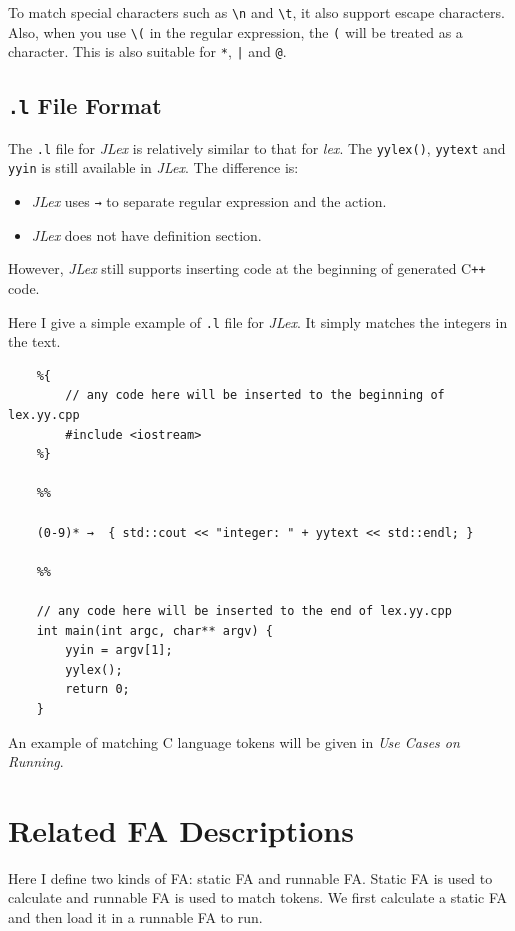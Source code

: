 \documentclass{article}
\begin{document}
To match special characters such as \texttt{\textbackslash n} and \texttt{\textbackslash t}, it also support escape characters. Also, when you use \texttt{\textbackslash (} in the regular expression, the \texttt{(} will be treated as a character. This is also suitable for \texttt{*}, \texttt{|} and \texttt{@}.

\subsection{\texttt{.l} File Format}

The \texttt{.l} file for \textit{JLex} is relatively similar to that for \textit{lex}. The \texttt{yylex()}, \texttt{yytext} and \texttt{yyin} is still available in \textit{JLex}. The difference is:
\begin{itemize}
    \item \textit{JLex} uses \texttt{→} to separate regular expression and the action.
    \item \textit{JLex} does not have definition section.
\end{itemize}
However, \textit{JLex} still supports inserting code at the beginning of generated C\texttt{++} code.

Here I give a simple example of \texttt{.l} file for \textit{JLex}. It simply matches the integers in the text.

\begin{lstlisting}
    %{
        // any code here will be inserted to the beginning of lex.yy.cpp
        #include <iostream>
    %}
    
    %%

    (0-9)* →  { std::cout << "integer: " + yytext << std::endl; }
    
    %%
    
    // any code here will be inserted to the end of lex.yy.cpp
    int main(int argc, char** argv) {
        yyin = argv[1];
        yylex();
        return 0;
    }
\end{lstlisting}

An example of matching C language tokens will be given in \textit{Use Cases on Running}.

\section{Related FA Descriptions}

Here I define two kinds of FA: static FA and runnable FA. Static FA is used to calculate and runnable FA is used to match tokens. We first calculate a static FA and then load it in a runnable FA to run.
\end{document}
